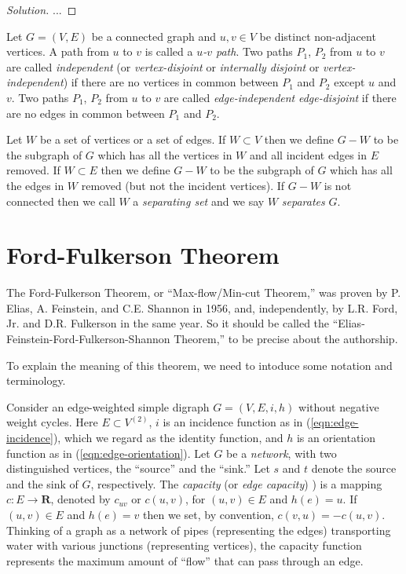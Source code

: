 \begin{proof}[Solution]

...

\end{proof}


Let $G=(V,E)$ be a connected graph and $u,v\in V$ be distinct non-adjacent
vertices. A path from $u$ to $v$ is called a 
{\it $u$-$v$ path}.
Two paths $P_1$, $P_2$ from $u$ to $v$ are called {\it independent}
(or {\it vertex-disjoint} or {\it internally disjoint} or
{\it vertex-independent}) if there are no vertices
in common between $P_1$ and $P_2$ except $u$ and $v$.
Two paths $P_1$, $P_2$ from $u$ to $v$ are called 
{\it edge-independent}
{\it edge-disjoint}
if there are no edges
in common between $P_1$ and $P_2$.

Let $W$ be a set of vertices or a set of edges.
If $W\subset V$ then we define $G-W$ to be the subgraph 
of $G$ which has all the vertices in $W$ and all incident
edges in $E$ removed.  If $W\subset E$ then we define $G-W$ to be the subgraph 
of $G$ which has all the edges in $W$ removed
(but not the incident vertices).
If $G-W$ is not connected then we call $W$ a 
{\it separating set} and we say $W$ {\it separates} $G$.

\section{Ford-Fulkerson Theorem}

The Ford-Fulkerson Theorem, or ``Max-flow/Min-cut Theorem,'' 
was proven by P. Elias, A. Feinstein, and C.E. Shannon in 1956, and,
independently, by L.R. Ford, Jr.  and D.R. Fulkerson in the same year.
So it should be called the
``Elias-Feinstein-Ford-Fulkerson-Shannon Theorem,''
to be precise about the authorship.

To explain the meaning of this theorem, we need to intoduce some
notation and  terminology.

Consider an edge-weighted simple 
digraph $G=(V,E,i,h)$ without negative weight
cycles. Here $E\subset V^{(2)}$,
$i$ is an incidence function as in 
(\ref{eqn:edge-incidence}), which we regard as the identity function,
and $h$ is an
orientation function as in (\ref{eqn:edge-orientation}).
Let $G$ be a {\it network}, 
with two distinguished vertices, the ``source'' and the ``sink.'' 
Let $s$ and $t$ denote the source and the sink of $G$, respectively.
The {\it capacity} (or {\it edge capacity})
)
is a mapping $c: E\to {\mathbf{R}}$, denoted by $c_{uv}$ 
or $c(u,v)$, for $(u,v)\in E$ and $h(e)= u$. 
If $(u,v)\in E$ and $h(e)= v$
then we set, by convention, $c(v,u)=-c(u,v)$.
Thinking of a graph as a network of pipes (representing the edges)
transporting water with various junctions (representing vertices), 
the capacity function represents the maximum amount 
of ``flow'' that can pass through an edge.


